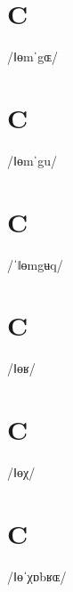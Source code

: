 \documentclass[10pt,a4paper,twoside]{book}
\begin{document}
\section*{C}

\begin{multicols}{3}
 {/ǁɵmˈgɶ/} {}
\end{multicols}

\section*{C}

\begin{multicols}{3}
 {/ǁɵmˈgu/} {}
\end{multicols}

\section*{C}

\begin{multicols}{3}
 {/ˈǁɵmgʉq/} {}
\end{multicols}

\section*{C}

\begin{multicols}{3}
 {/ǁɵʁ/} {}
\end{multicols}

\section*{C}

\begin{multicols}{3}
 {/ǁɵχ/} {}
\end{multicols}

\section*{C}

\begin{multicols}{3}
 {/ǁɵˈχɒbʁɶ/} {}
\end{multicols}
\end{document}
